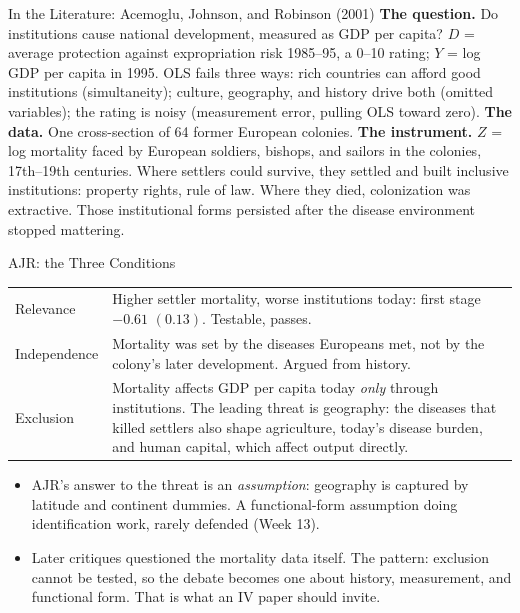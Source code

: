 \documentclass[aspectratio=169,11pt,xcolor=dvipsnames]{beamer}
\begin{document}
\begin{frame}{In the Literature: Acemoglu, Johnson, and Robinson (2001)}
\textbf{The question.} Do institutions cause national development, measured
as GDP per capita? $D$ = average protection
against expropriation risk 1985--95, a 0--10 rating; $Y$ = log GDP per capita
in 1995. OLS fails three ways: rich countries can afford good institutions
(simultaneity); culture, geography, and history drive both (omitted
variables); the rating is noisy (measurement error, pulling OLS toward zero).
\vskip3pt
\textbf{The data.} One cross-section of 64 former European colonies.
\vskip3pt
\textbf{The instrument.} $Z$ = log mortality faced by European soldiers,
bishops, and sailors in the colonies, 17th--19th centuries. Where settlers
could survive, they settled and built inclusive institutions: property rights,
rule of law. Where they died, colonization was extractive. Those institutional
forms persisted after the disease environment stopped mattering.
\end{frame}

\begin{frame}{AJR: the Three Conditions}
\begin{center}\footnotesize
\renewcommand{\arraystretch}{1.15}
\begin{tabular}{@{}lp{10.6cm}@{}}
\toprule
Relevance & Higher settler mortality, worse institutions today: first stage
  $-0.61$ $(0.13)$. \alert{Testable, passes.} \\
Independence & Mortality was set by the diseases Europeans met, not by the
  colony's later development. Argued from history. \\
Exclusion & Mortality affects GDP per capita today \emph{only} through institutions.
  \alert{The leading threat is geography}: the diseases that killed settlers
  also shape agriculture, today's disease burden, and human capital, which
  affect output directly. \\
\bottomrule
\end{tabular}
\end{center}
\vskip2pt
\begin{itemize}\itemsep2pt
  \item AJR's answer to the threat is an \emph{assumption}: geography is
        captured by latitude and continent dummies. A functional-form
        assumption doing identification work, rarely defended (Week 13).
  \item Later critiques questioned the mortality data itself. \alert{The
        pattern}: exclusion cannot be tested, so the debate becomes one about
        history, measurement, and functional form. That is what an IV paper
        should invite.
\end{itemize}
\end{frame}
\end{document}
